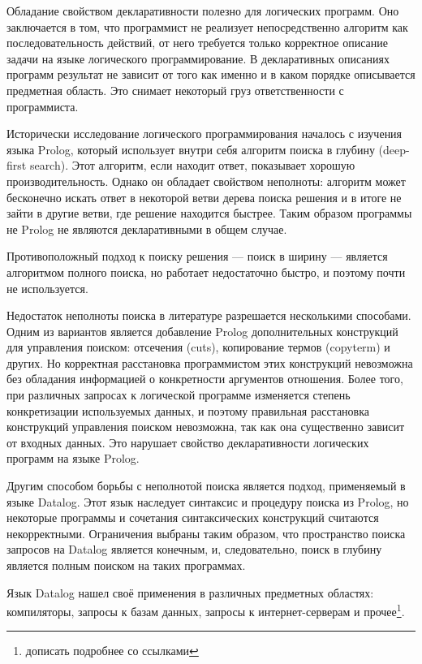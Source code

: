 Обладание свойством декларативности полезно для логических программ. Оно заключается в том, что программист не реализует непосредственно алгоритм как последовательность действий, от него требуется только корректное описание задачи на языке логического программирование. В декларативных описаниях программ результат не зависит от того как именно и в каком порядке описывается предметная область. Это снимает некоторый груз ответственности с программиста. 

Исторически исследование логического программирования началось с изучения языка Prolog, который использует внутри себя  алгоритм поиска в глубину (deep-first search). Этот алгоритм, если находит ответ, показывает хорошую производительность. Однако он обладает свойством неполноты: алгоритм может бесконечно искать ответ в некоторой ветви дерева поиска решения и в итоге не зайти в другие ветви, где решение находится быстрее. Таким образом программы не Prolog не являются декларативными в общем случае.

Противоположный подход к поиску решения --- поиск в ширину --- является алгоритмом полного поиска, но работает недостаточно быстро, и поэтому почти не используется.

Недостаток неполноты поиска в литературе разрешается несколькими способами. Одним из вариантов является добавление Prolog дополнительных конструкций для управления поиском: отсечения (cuts), копирование термов (copyterm) и других. Но корректная расстановка программистом этих конструкций невозможна без обладания информацией о конкретности аргументов отношения. Более того, при различных запросах к логической программе изменяется степень конкретизации используемых данных, и поэтому правильная расстановка конструкций управления поиском невозможна, так как она существенно зависит от входных данных. Это нарушает свойство декларативности логических программ на языке Prolog.

Другим способом борьбы с неполнотой поиска является подход, применяемый в языке Datalog. Этот язык наследует синтаксис и процедуру поиска из Prolog, но некоторые программы и сочетания синтаксических конструкций считаются некорректными. Ограничения выбраны таким образом, что пространство поиска запросов на Datalog является конечным, и, следовательно, поиск в глубину является полным поиском на таких программах. 

Язык Datalog нашел своё применения в различных предметных областях: компиляторы, запросы к базам данных, запросы к интернет-серверам и прочее\footnote{дописать подробнее со ссылками}.

